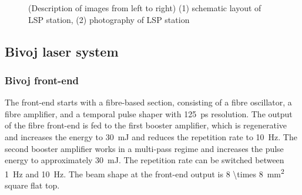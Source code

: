 \begin{figure}[H]
\begin{center}
  \hspace{1cm}
  \caption[Časové odezvy virtuálního modelu vodní nádrže]
    {(Description of images from left to right) (1) schematic layout of LSP station, (2) photography of LSP station \cite{bohm_kaufman_brajer_rostohar_2019}}
  \label{fig:lsplayout}
\end{center}
\end{figure}

\subsection{Bivoj laser system}

\subsubsection*{Bivoj front-end}

The front-end starts with a fibre-based section, consisting
of a fibre oscillator, a fibre amplifier, and a temporal pulse shaper
with \SI{125}{\ps} resolution. The output of the fibre front-end is fed
to the first booster amplifier, which is regenerative and
increases the energy to \SI{30}{\milli\joule} and reduces the repetition rate to \SI{10}{\hertz}. The second booster amplifier works in a multi-pass regime
and increases the pulse energy to approximately \SI{30}{\milli\joule}.
The repetition rate can be switched between \SI{1}{\hertz} and \SI{10}{\hertz}. The
beam shape at the front-end output is \SI{8 \times 8}{\mm\squared} square flat top.

